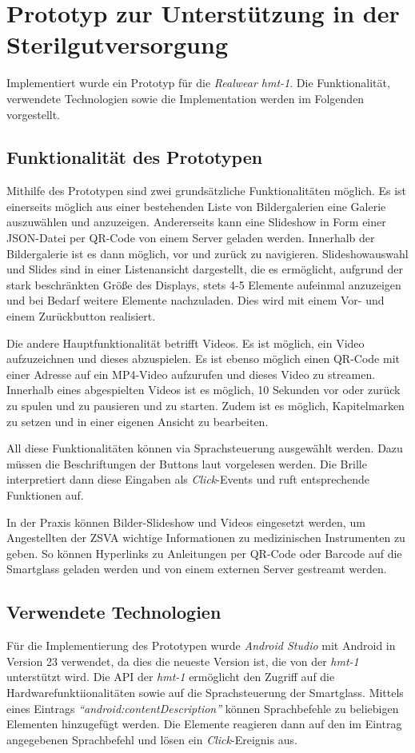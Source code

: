 %
%
%
%
%
%
\chapter{Prototyp zur Unterstützung in der Sterilgutversorgung}
\label{ch:Prototyp}
Implementiert wurde ein Prototyp für die \emph{Realwear hmt-1}. Die Funktionalität, verwendete Technologien sowie die Implementation werden im Folgenden vorgestellt.
%
%
\section{Funktionalität des Prototypen}
Mithilfe des Prototypen sind zwei grundsätzliche Funktionalitäten möglich. Es ist einerseits möglich aus einer bestehenden Liste von Bildergalerien eine Galerie auszuwählen und anzuzeigen. Andererseits kann eine Slideshow in Form einer JSON-Datei per QR-Code von einem Server geladen werden. Innerhalb der Bildergalerie ist es dann möglich, vor und zurück zu navigieren. Slideshowauswahl und Slides sind in einer Listenansicht dargestellt, die es ermöglicht, aufgrund der stark beschränkten Größe des Displays, stets 4-5 Elemente aufeinmal anzuzeigen und bei Bedarf weitere Elemente nachzuladen. Dies wird mit einem Vor- und einem Zurückbutton realisiert.

Die andere Hauptfunktionalität betrifft Videos. Es ist möglich, ein Video aufzuzeichnen und dieses abzuspielen. Es ist ebenso möglich einen QR-Code mit einer Adresse auf ein MP4-Video aufzurufen und dieses Video zu streamen. Innerhalb eines abgespielten Videos ist es möglich, 10 Sekunden vor oder zurück zu spulen und zu pausieren und zu starten. Zudem ist es möglich, Kapitelmarken zu setzen und in einer eigenen Ansicht zu bearbeiten.

All diese Funktionalitäten können via Sprachsteuerung ausgewählt werden. Dazu müssen die Beschriftungen der Buttons laut vorgelesen werden. Die Brille interpretiert dann diese Eingaben als \emph{Click}-Events und ruft entsprechende Funktionen auf.

In der Praxis können Bilder-Slideshow und Videos eingesetzt werden, um Angestellten der ZSVA wichtige Informationen zu medizinischen Instrumenten zu geben. So können Hyperlinks zu Anleitungen per QR-Code oder Barcode auf die Smartglass geladen werden und von einem externen Server gestreamt werden.
%
%
%
%
%
%
\section{Verwendete Technologien}
\label{sec:Verwendete_Technologien}
Für die Implementierung des Prototypen wurde \emph{Android Studio} mit Android in Version 23 verwendet, da dies die neueste Version ist, die von der \emph{hmt-1} unterstützt wird. Die API der \emph{hmt-1} ermöglicht den Zugriff auf die Hardwarefunktiionalitäten sowie auf die Sprachsteuerung der Smartglass. Mittels eines Eintrags \emph{\enquote{android:contentDescription}} können Sprachbefehle zu beliebigen Elementen hinzugefügt werden. Die Elemente reagieren dann auf den im Eintrag angegebenen Sprachbefehl und lösen ein \emph{Click}-Ereignis aus.


